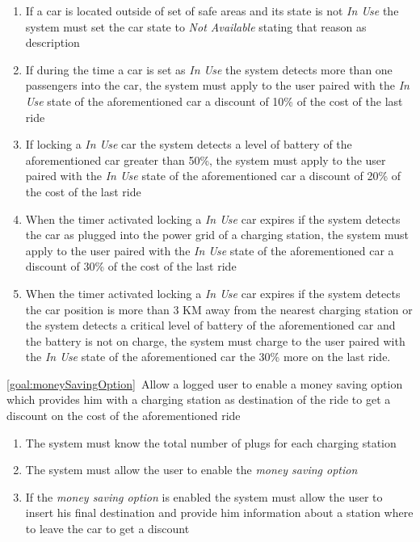 \begin{description}
\begin{enumerate}[resume*]
  				\item If a car is located outside of set of safe areas and its state is not \emph{In
  				Use} the system must set the car state to \emph{Not Available} stating that reason
  				as description
  				\item If during the time a car is set as \emph{In Use} the system detects more than
  				one passengers into the car, the system must apply to the user paired with
  				the \emph{In Use} state of the aforementioned car a discount of 10\% of the cost
  				of the last ride
  				\item If locking  a \emph{In Use} car the system detects a level of battery of the
  				aforementioned car greater than 50\%, the system must apply to the user paired with
  				the \emph{In Use} state of the aforementioned car a discount of 20\% of the cost
  				of the last ride
  				\item When the timer activated locking a \emph{In Use} car expires if the system
  				detects the car as plugged into the power grid of a charging station, the system must
  				apply to the user paired with the \emph{In Use} state of the aforementioned car a
  				discount of 30\% of the cost of the last ride
  				\item When the timer activated locking a \emph{In Use} car expires if the system
  				detects the car position is more than 3 KM away from the nearest charging station
  				or the system detects a critical level of battery of the aforementioned car and the
  				battery is not on charge, the system must charge to the user paired with the \emph{In
  				Use} state of the aforementioned car the 30\% more on the last ride. 
   			\end{enumerate}
  		\item \ref{goal:moneySavingOption}\ Allow a logged user to enable a money saving option which provides him with a charging station as destination of the ride to get a discount on the cost of the aforementioned ride
  			\begin{enumerate}[resume*]
  				\item The system must know the total number of plugs for each charging station
  				\item The system must allow the user to enable the \emph{money saving option}
  				\item If the  \emph{money saving option} is enabled the system must allow the user
  				to insert his final destination and provide him information about a station where to
  				leave the car to get a discount

\end{enumerate}
\end{description}
